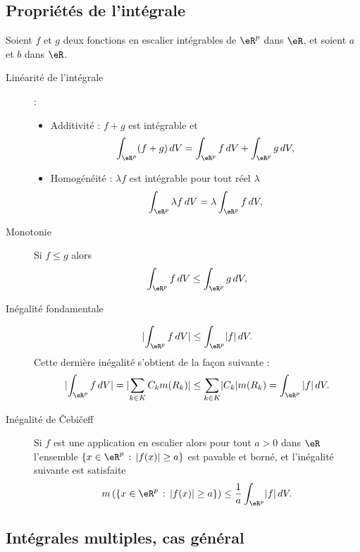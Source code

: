 \subsection{Propriétés de l'intégrale}

Soient $f$ et $g$ deux fonctions en escalier intégrables de $\eR^p$ dans $\eR$, et soient $a$ et $b$ dans $\eR$.
\begin{description}
\item[Linéarité de l'intégrale] :
  \begin{itemize}
  \item Additivité : $f+g$ est intégrable et
\[
\int_{\eR^p} (f+g)\, dV = \int_{\eR^p} f\, dV+ \int_{\eR^p} g\, dV,
\]
\item Homogénéité : $\lambda f$ est intégrable pour tout réel $\lambda$
\[
\int_{\eR^p} \lambda  f\, dV = \lambda\int_{\eR^p} f\, dV,
\]
  \end{itemize}
\item[Monotonie] Si $f\leq g$ alors
\[
 \int_{\eR^p} f\, dV\leq \int_{\eR^p} g\, dV,
\]
\item[Inégalité fondamentale]
  \[
\lvert \int_{\eR^p}f\,dV\rvert \leq\int_{\eR^p}\lvert f\rvert\,dV.
\]
Cette dernière inégalité s'obtient de la façon suivante :
\[
\lvert\int_{\eR^p}f\,dV\rvert =\lvert \sum_{k\in K} C_k m(R_k)\rvert \leq\sum_{k\in K}\lvert C_k\rvert m(R_k)=\int_{\eR^p}|f|\,dV.
\]
\item[Inégalité de Čebičeff]  Si $f$ est une application en escalier alors pour tout $a>0$ dans $\eR$ l'ensemble $\{x\in\eR^p\,:\, |f(x)|\geq a\}$ est pavable et borné, et l'inégalité suivante est satisfaite
\[
m\left(\{x\in\eR^p\,:\, |f(x)|\geq a\}\right)\leq \frac{1}{a} \int_{\eR^p}\lvert f\rvert\,dV.
\]
\end{description}

\subsection{Intégrales multiples, cas général}

